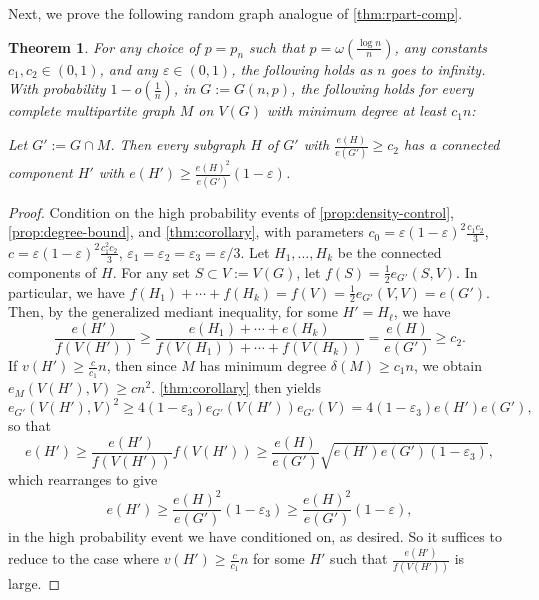 \documentclass[12pt]{amsart}
\newtheorem{theorem}{Theorem}[section]
\theoremstyle{definition}
\numberwithin{equation}{section}
\begin{document}
Next, we prove the following random graph analogue of \cref{thm:rpart-comp}.
\begin{theorem}
	\label{thm:multipartite}
    For any choice of $p=p_n$ such that $p=\omega(\frac{\log n}n)$, any constants $c_1,c_2 \in (0, 1)$, and any $\varepsilon\in (0,1)$, the following holds as $n$ goes to infinity. With probability $1-o(\frac1n)$, in $G:=G(n, p)$, the following holds for every complete multipartite graph $M$ on $V(G)$ with minimum degree at least $c_1 n$:
    
    Let $G':=G\cap M$. Then every subgraph $H$ of $G'$ with $\frac{e(H)}{e(G')}\ge c_2$ has a connected component $H'$ with $e(H')\ge \frac{e(H)^2}{e(G')}(1-\varepsilon)$.
\end{theorem}
\begin{proof}
    Condition on the high probability events of \cref{prop:density-control}, \cref{prop:degree-bound}, and \cref{thm:corollary}, with parameters $c_0=\varepsilon(1-\varepsilon)^2\frac{c_1 c_2}{3}$, $c=\varepsilon(1-\varepsilon)^2\frac{c_1^2 c_2}{3}$, $\varepsilon_1=\varepsilon_2=\varepsilon_3=\varepsilon/3$. Let $H_1,\dots, H_k$ be the connected components of $H$. For any set $S\subset V:=V(G)$, let $f(S)=\frac12e_{G'}(S, V)$. In particular, we have $f(H_1)+\cdots+f(H_k)=f(V)=\frac{1}{2}e_{G'}(V,V)=e(G')$. 
    Then, by the generalized mediant inequality, for some $H'=H_\ell$, we have
    \[\frac{e(H')}{f(V(H'))} \ge \frac{e(H_1)+\cdots+e(H_k)}{f(V(H_1))+\cdots+f(V(H_k))} = \frac{e(H)}{e(G')}\ge c_2.\] 
    If $v(H')\ge \frac{c}{c_1}n$, then since $M$ has minimum degree $\delta(M)\ge c_1 n$, we obtain $e_M(V(H'),V)\ge cn^2$. \cref{thm:corollary} then yields
    \[
        e_{G'}(V(H'),V)^2\ge 4(1-\varepsilon_3)e_{G'}(V(H'))e_{G'}(V)=4(1-\varepsilon_3)e(H')e(G'),
    \]
    so that
    \[
        e(H')\ge \frac{e(H')}{f(V(H'))} f(V(H')) \ge \frac{e(H)}{e(G')}\sqrt{e(H')e(G')(1-\varepsilon_3)},
    \]
    which rearranges to give
	\[e(H')\ge \frac{e(H)^2}{e(G')}(1-\varepsilon_3)\ge \frac{e(H)^2}{e(G')}(1-\varepsilon),\]
    in the high probability event we have conditioned on, as desired. So it suffices to reduce to the case where $v(H')\ge \frac{c}{c_1}n$ for some $H'$ such that $\frac{e(H')}{f(V(H'))}$ is large. 
    

\end{proof}
\end{document}
